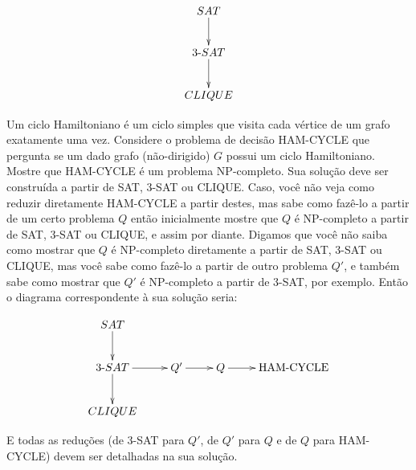 \documentclass[12pt]{article}
\begin{document}
\begin{enumerate}
  $$\xymatrix{
    SAT \ar[d] \\
    3\mbox{-}SAT \ar[d] \\
    CLIQUE 
  }$$
  
  Um ciclo Hamiltoniano é um ciclo simples que visita cada vértice de
  um grafo exatamente uma vez. Considere o problema de decisão
  HAM-CYCLE que pergunta se um dado grafo (não-dirigido) $G$ possui um
  ciclo Hamiltoniano. Mostre que HAM-CYCLE é um problema
  NP-completo. Sua solução deve ser construída a partir de SAT, 3-SAT
  ou CLIQUE. Caso, você não veja como reduzir diretamente HAM-CYCLE a
  partir destes, mas sabe como fazê-lo a partir de um certo problema
  $Q$ então inicialmente mostre que $Q$ é NP-completo a partir de SAT,
  3-SAT ou CLIQUE, e assim por diante. Digamos que você não saiba como
  mostrar que $Q$ é NP-completo diretamente a partir de SAT, 3-SAT ou
  CLIQUE, mas você sabe como fazê-lo a partir de outro problema $Q'$,
  e também sabe como mostrar que $Q'$ é NP-completo a partir de 3-SAT,
  por exemplo. Então o diagrama correspondente à sua solução seria:

$$\xymatrix{
  SAT \ar[d] & & & \\
  3\mbox{-}SAT \ar[d]\ar[r] & Q' \ar[r] & Q \ar[r] & \mbox{HAM-CYCLE}  \\
  CLIQUE & & & 
}$$

E todas as reduções (de 3-SAT para $Q'$, de $Q'$ para $Q$ e de $Q$ para HAM-CYCLE) devem ser detalhadas na sua solução.


\end{enumerate}
\end{document}
